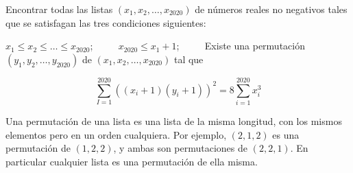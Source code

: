 Encontrar todas las listas $(x_1, x_2, \ldots, x_{2020})$ de números reales no negativos tales que se satisfagan las tres condiciones siguientes:

    $x_1 \le x_2 \le \ldots \le x_{2020}$; $\qquad$  
    $x_{2020} \le x_1 + 1$;  $\qquad$ 
    Existe una permutación $(y_1, y_2, \ldots, y_{2020})$ de $(x_1, x_2, \ldots, x_{2020})$ tal que

\[\sum_{I = 1}^{2020} ((x_i + 1)(y_i + 1))^2 = 8 \sum_{i = 1}^{2020} x_i^3\]


Una permutación de una lista es una lista de la misma longitud, con los mismos elementos pero en un
orden cualquiera. Por ejemplo, $(2, 1, 2)$ es una permutación de $(1, 2, 2)$, y ambas son permutaciones
de $(2, 2, 1)$. En particular cualquier lista es una permutación de ella misma.